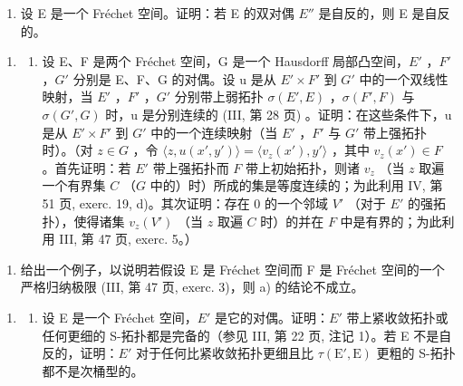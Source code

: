 \begin{enumerate}
\def\labelenumi{\alph{enumi})}
\setcounter{enumi}{1}
\tightlist
\item
  设 E 是一个 Fréchet 空间。证明：若 E 的双对偶 \(E''\) 是自反的，则 E 是自反的。
\end{enumerate}

\begin{enumerate}
\def\labelenumi{\arabic{enumi})}
\setcounter{enumi}{12}
\tightlist
\item
  \begin{enumerate}
  \def\labelenumii{\alph{enumii})}
  \tightlist
  \item
    设 E、F 是两个 Fréchet 空间，G 是一个 Hausdorff 局部凸空间，\(E'\) ，\(F'\) ，\(G'\) 分别是 E、F、G 的对偶。设 u 是从 \(E' \times F'\) 到 \(G'\) 中的一个双线性映射，当 \(E'\) ，\(F'\) ，\(G'\) 分别带上弱拓扑 \(\sigma(E', E)\) ，\(\sigma(F', F)\) 与 \(\sigma(G', G)\) 时，u 是分别连续的 (III, 第 28 页) 。证明：在这些条件下，u 是从 \(E' \times F'\) 到 \(G'\) 中的一个连续映射（当 \(E'\) ，\(F'\) 与 \(G'\) 带上强拓扑时）。（对 \(z \in G\) ，令 \(\langle z, u(x', y') \rangle = \langle v_z(x'), y' \rangle\) ，其中 \(v_z(x') \in F\) 。首先证明：若 \(E'\) 带上强拓扑而 \(F\) 带上初始拓扑，则诸 \(v_z\) （当 \(z\) 取遍一个有界集 \(C\) （\(G\) 中的）时）所成的集是等度连续的；为此利用 IV, 第 51 页, exerc. 19, d)。其次证明：存在 0 的一个邻域 \(V'\) （对于 \(E'\) 的强拓扑），使得诸集 \(v_z(V')\) （当 \(z\) 取遍 \(C\) 时）的并在 \(F\) 中是有界的；为此利用 III, 第 47 页, exerc. 5。）
  \end{enumerate}
\end{enumerate}

\begin{enumerate}
\def\labelenumi{\alph{enumi})}
\setcounter{enumi}{1}
\tightlist
\item
  给出一个例子，以说明若假设 E 是 Fréchet 空间而 F 是 Fréchet 空间的一个严格归纳极限 (III, 第 47 页, exerc. 3)，则 a) 的结论不成立。
\end{enumerate}

\begin{enumerate}
\def\labelenumi{\arabic{enumi})}
\setcounter{enumi}{13}
\tightlist
\item
  \begin{enumerate}
  \def\labelenumii{\alph{enumii})}
  \tightlist
  \item
    设 E 是一个 Fréchet 空间，\(E'\) 是它的对偶。证明：\(E'\) 带上紧收敛拓扑或任何更细的 S-拓扑都是完备的（参见 III, 第 22 页, 注记 1）。若 E 不是自反的，证明：\(E'\) 对于任何比紧收敛拓扑更细且比 \(\tau(\mathrm{E}', \mathrm{E})\) 更粗的 S-拓扑都不是次桶型的。
  \end{enumerate}
\end{enumerate}

